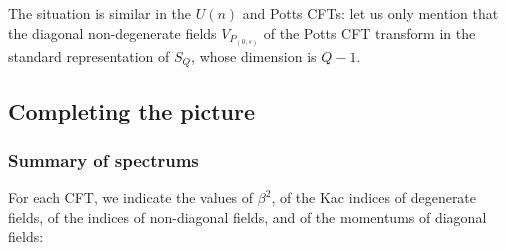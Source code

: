 \documentclass[12pt, a4paper]{article}
\theoremstyle{break}
\begin{document}
The situation is similar in the $U(n)$ and Potts CFTs: let us only mention that the diagonal non-degenerate fields $V_{P_{(0,s)}}$ of the Potts CFT transform in the standard  representation of $S_Q$, whose dimension is $Q-1$. 


\subsection{Completing the picture}

\subsubsection{Summary of spectrums}

For each CFT, we indicate the values of $\beta^2$, of the Kac indices of degenerate fields, of the indices of non-diagonal fields, and of the momentums of diagonal fields:
\end{document}
